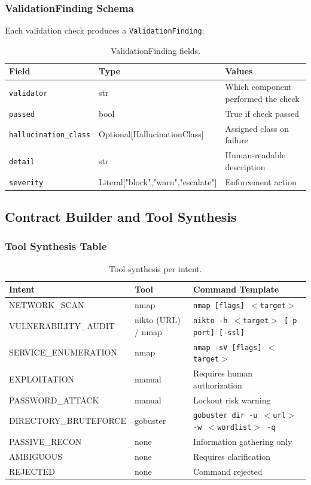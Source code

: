 ﻿\documentclass[10pt,journal,onecolumn]{IEEEtran}
\begin{document}
\subsubsection{ValidationFinding Schema}
Each validation check produces a \texttt{ValidationFinding}:
\begin{table}[t]
\caption{ValidationFinding fields.}
\label{tab:vf}
\begin{tabularx}{\textwidth}{>{\ttfamily}l l X}
\toprule
\textbf{Field} & \textbf{Type} & \textbf{Values}\\
\midrule
\texttt{validator} & str & Which component performed the check\\
\texttt{passed} & bool & True if check passed\\
\texttt{hallucination\_class} & Optional[HallucinationClass] & Assigned class on failure\\
\texttt{detail} & str & Human-readable description\\
\texttt{severity} & Literal["block","warn","escalate"] & Enforcement action\\
\bottomrule
\end{tabularx}
\end{table}

\subsection{Contract Builder and Tool Synthesis}

\subsubsection{Tool Synthesis Table}
\begin{table}[t]
\caption{Tool synthesis per intent.}
\label{tab:toolsynth}
\begin{tabularx}{\textwidth}{>{\ttfamily}l l X}
\toprule
\textbf{Intent} & \textbf{Tool} & \textbf{Command Template}\\
\midrule
NETWORK\_SCAN & nmap & \texttt{nmap [flags] $<$target$>$}\\
VULNERABILITY\_AUDIT & nikto (URL) / nmap & \texttt{nikto -h $<$target$>$ [-p port] [-ssl]}\\
SERVICE\_ENUMERATION & nmap & \texttt{nmap -sV [flags] $<$target$>$}\\
EXPLOITATION & manual & Requires human authorization\\
PASSWORD\_ATTACK & manual & Lockout risk warning\\
DIRECTORY\_BRUTEFORCE & gobuster & \texttt{gobuster dir -u $<$url$>$ -w $<$wordlist$>$ -q}\\
PASSIVE\_RECON & none & Information gathering only\\
AMBIGUOUS & none & Requires clarification\\
REJECTED & none & Command rejected\\
\bottomrule
\end{tabularx}
\end{table}
\end{document}
